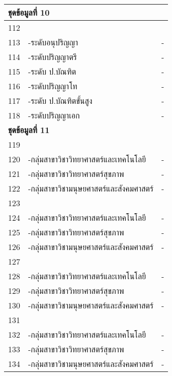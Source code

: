 \begin{longtable}{|c|p{}|c|}
	\multicolumn{3}{|l|}{\textbf{ชุดข้อมูลที่ 10}}\\\hline
	112&\cellcolor{red!10}{จำนวนนักศึกษาเต็มเวลาเทียบเท่า (FTES) รวมทุกหลักสูตร}&\cellcolor{red!10}{\textbf{-}}\\\hline
	113&-ระดับอนุปริญญา&-\\\hline
	114&-ระดับปริญญาตรี&-\\\hline
	115&-ระดับ ป.บัณฑิต&-\\\hline
	116&-ระดับปริญญาโท&-\\\hline
	117&-ระดับ ป.บัณฑิตขั้นสูง&-\\\hline
	118&-ระดับปริญญาเอก&-\\\hline
	
	\multicolumn{3}{|l|}{\textbf{ชุดข้อมูลที่ 11}}\\\hline
	119&\cellcolor{red!10}{จำนวนเงินสนับสนุนงานวิจัยหรืองานสร้างสรรค์จากภายในสถาบัน}&\cellcolor{red!10}{}\\\hline
	120&-กลุ่มสาขาวิชาวิทยาศาสตร์และเทคโนโลยี&-\\\hline
	121&-กลุ่มสาขาวิชาวิทยาศาสตร์สุขภาพ&-\\\hline
	122&-กลุ่มสาขาวิชามนุษยศาสตร์และสังคมศาสตร์&-\\\hline
	
	123&\cellcolor{red!10}{จำนวนเงินสนับสนุนงานวิจัยหรืองานสร้างสรรค์จากภายนอกสถาบัน}&\cellcolor{red!10}{}\\\hline
	124&-กลุ่มสาขาวิชาวิทยาศาสตร์และเทคโนโลยี&-\\\hline
	125&-กลุ่มสาขาวิชาวิทยาศาสตร์สุขภาพ&-\\\hline
	126&-กลุ่มสาขาวิชามนุษยศาสตร์และสังคมศาสตร์&-\\\hline
	
	127&\cellcolor{red!10}{จำนวนอาจารย์ประจำที่ปฏิบัติงานจริง (ไม่นับรวมผู้ลาศึกษาต่อ)}&\cellcolor{red!10}{}\\\hline
	128&-กลุ่มสาขาวิชาวิทยาศาสตร์และเทคโนโลยี&-\\\hline
	129&-กลุ่มสาขาวิชาวิทยาศาสตร์สุขภาพ&-\\\hline
	130&-กลุ่มสาขาวิชามนุษยศาสตร์และสังคมศาสตร์&-\\\hline
	
	131&\cellcolor{red!10}{จำนวนนักวิจัยประจำที่ปฏิบัติงานจริง (ไม่นับรวมผู้ลาศึกษาต่อ)}&\cellcolor{red!10}{\textbf{-}}\\\hline
	132&-กลุ่มสาขาวิชาวิทยาศาสตร์และเทคโนโลยี&-\\\hline
	133&-กลุ่มสาขาวิชาวิทยาศาสตร์สุขภาพ&-\\\hline
	134&-กลุ่มสาขาวิชามนุษยศาสตร์และสังคมศาสตร์&-\\\hline
	

\end{longtable}
